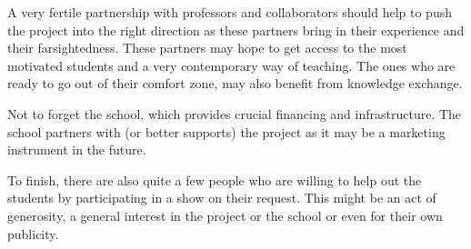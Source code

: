 A very fertile partnership with professors and collaborators should help
to push the project into the right direction as these partners bring in
their experience and their farsightedness. These partners may hope to
get access to the most motivated students and a very contemporary way of
teaching. The ones who are ready to go out of their comfort zone, may
also benefit from knowledge exchange.

Not to forget the school, which provides crucial financing and
infrastructure. The school partners with (or better supports) the
project as it may be a marketing instrument in the future.

To finish, there are also quite a few people who are willing to help out
the students by participating in a show on their request. This might be
an act of generosity, a general interest in the project or the school or
even for their own publicity.
